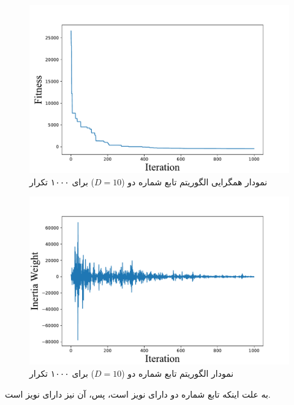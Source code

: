  \begin{figure}[H]
	\caption{نمودار همگرایی الگوریتم  تابع شماره دو ($D=10$) برای ۱۰۰۰ تکرار } 
	\centering 
	\includegraphics[width=16cm]{../Figure/Q1/PSO_II_convergence_curve} 
\end{figure}

\begin{figure}[H]
	\caption{نمودار  الگوریتم  تابع شماره دو ($D=10$) برای ۱۰۰۰ تکرار } 
	\centering 
	\includegraphics[width=16cm]{../Figure/Q1/PSO_II_inertia_weight} 
\end{figure}

به علت اینکه تابع شماره دو دارای نویز است، پس، 
آن نیز دارای نویز است.

